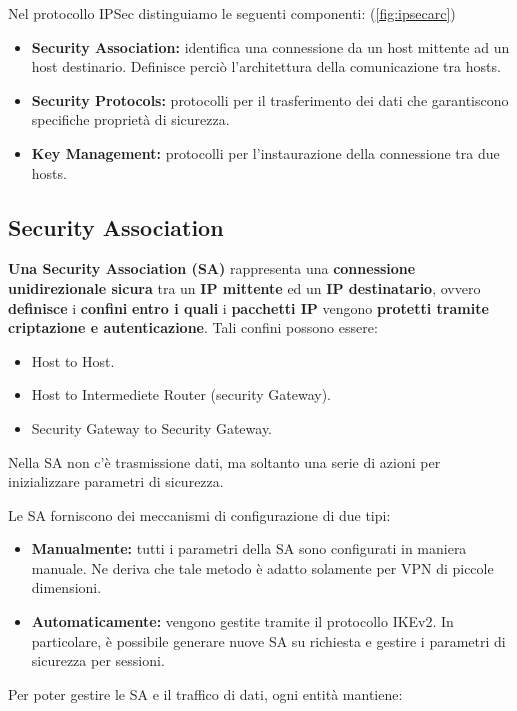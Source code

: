 \pagebreak
\begin{definition}\label{def:ipsecarc}
Nel protocollo IPSec distinguiamo le seguenti componenti: (\cref{fig:ipsecarc})
\begin{itemize}
    \item \textbf{Security Association:} identifica una connessione da un host mittente ad un host destinario. Definisce perciò l'architettura della comunicazione tra hosts.
    \item \textbf{Security Protocols:} protocolli per il trasferimento dei dati che garantiscono specifiche proprietà di sicurezza.
    \item \textbf{Key Management:} protocolli per l’instaurazione della connessione tra due hosts.
\end{itemize}
\end{definition}
\subsection{Security Association}
\textbf{Una Security Association (SA)} rappresenta una \textbf{connessione unidirezionale sicura} tra un \textbf{IP mittente} ed un \textbf{IP destinatario}, ovvero \textbf{definisce} i \textbf{confini} \textbf{entro i quali} i \textbf{pacchetti IP} vengono \textbf{protetti tramite criptazione e autenticazione}. Tali confini possono essere:
\begin{itemize}
    \item Host to Host.
    \item Host to Intermediete Router (security Gateway).
    \item Security Gateway to Security Gateway.
\end{itemize}
\begin{note}
Nella SA non c'è trasmissione dati, ma soltanto una serie di azioni per inizializzare parametri di sicurezza.
\end{note}
\begin{proposition}[SA Setup]\label{prop:sasetup}
Le SA forniscono dei meccanismi di configurazione di due tipi:
\begin{itemize}
    \item \textbf{Manualmente:} tutti i parametri della SA sono configurati in maniera manuale. Ne deriva che tale metodo è adatto solamente per VPN di piccole dimensioni.
    \item \textbf{Automaticamente:} vengono gestite tramite il protocollo IKEv2. In particolare, è possibile generare nuove SA su richiesta e gestire i parametri di sicurezza per sessioni.
\end{itemize}
\end{proposition}
Per poter gestire le SA e il traffico di dati, ogni entità mantiene:

